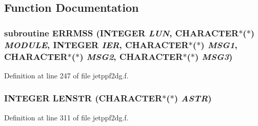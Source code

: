 \subsection{Function Documentation}
\hypertarget{jetppf2dg_8f_88b4bbb0de229b4aa029fbc5b4f04d38}{
\subsubsection[ERRMSS]{\setlength{\rightskip}{0pt plus 5cm}subroutine ERRMSS (INTEGER {\em LUN}, \/  CHARACTER$\ast$($\ast$) {\em MODULE}, \/  INTEGER {\em IER}, \/  CHARACTER$\ast$($\ast$) {\em MSG1}, \/  CHARACTER$\ast$($\ast$) {\em MSG2}, \/  CHARACTER$\ast$($\ast$) {\em MSG3})}}
\label{jetppf2dg_8f_88b4bbb0de229b4aa029fbc5b4f04d38}




Definition at line 247 of file jetppf2dg.f.\hypertarget{jetppf2dg_8f_8beaeacd88b0646f07683a6b6d148ca4}{
\subsubsection[LENSTR]{\setlength{\rightskip}{0pt plus 5cm}INTEGER LENSTR (CHARACTER$\ast$($\ast$) {\em ASTR})}}
\label{jetppf2dg_8f_8beaeacd88b0646f07683a6b6d148ca4}




Definition at line 311 of file jetppf2dg.f.